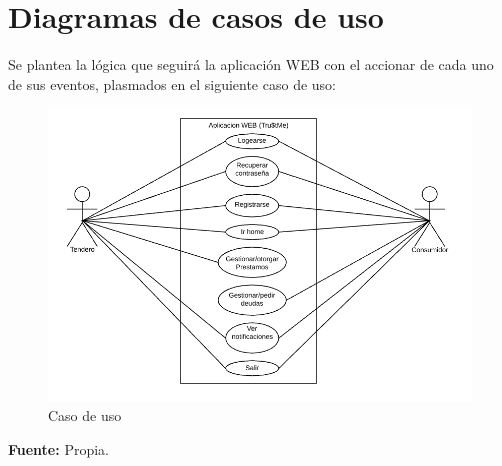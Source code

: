 \section{Diagramas de casos de uso}

{Se plantea la lógica que seguirá la aplicación WEB con el accionar de cada uno de sus eventos, plasmados en el siguiente caso de uso:

\begin{figure}[H]
	\centering
	\includegraphics[width=1\linewidth]{development/casos.png}
	\caption{Caso de uso}
\end{figure}}
\begin{center}
	\textbf{Fuente:} Propia.
\end{center}

